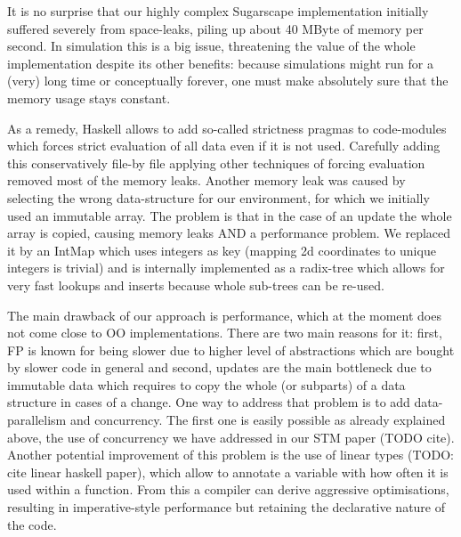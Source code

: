 It is no surprise that our highly complex Sugarscape implementation initially suffered severely from space-leaks, piling up about 40 MByte of memory per second. In simulation this is a big issue, threatening the value of the whole implementation despite its other benefits: because simulations might run for a (very) long time or conceptually forever, one must make absolutely sure that the memory usage stays constant.

As a remedy, Haskell allows to add so-called strictness pragmas to code-modules which forces strict evaluation of all data even if it is not used. Carefully adding this conservatively file-by file applying other techniques of forcing evaluation removed most of the memory leaks. Another memory leak was caused by selecting the wrong data-structure for our environment, for which we initially used an immutable array. The problem is that in the case of an update the whole array is copied, causing memory leaks AND a performance problem. We replaced it by an IntMap which uses integers as key (mapping 2d coordinates to unique integers is trivial) and is internally implemented as a radix-tree which allows for very fast lookups and inserts because whole sub-trees can be re-used.

The main drawback of our approach is performance, which at the moment does not come close to OO implementations. There are two main reasons for it: first, FP is known for being slower due to higher level of abstractions which are bought by slower code in general and second, updates are the main bottleneck due to immutable data which requires to copy the whole (or subparts) of a data structure in cases of a change. One way to address that problem is to add data-parallelism and concurrency. The first one is easily possible as already explained above, the use of concurrency we have addressed in our STM paper (TODO cite). Another potential improvement of this problem is the use of linear types (TODO: cite linear haskell paper), which allow to annotate a variable with how often it is used within a function. From this a compiler can derive aggressive optimisations, resulting in imperative-style performance but retaining the declarative nature of the code.